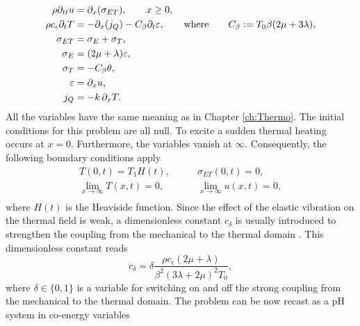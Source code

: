 \begin{equation}
\begin{aligned}
\displaystyle \rho \partial_{tt} u &= \partial_x ({\sigma}_{ET}), \qquad x\ge 0,  \\
\displaystyle \rho c_\epsilon \partial_{t} T &= -\partial_x(j_Q) - {C}_\beta \partial_t \varepsilon, \qquad \text{where} \qquad {C}_\beta:=T_0 \beta(2\mu + 3\lambda),\\
{\sigma}_{ET} &= {\sigma}_E + {\sigma}_{T}, \\
{\sigma}_E &= (2\mu + \lambda) \varepsilon , \\
{\sigma}_T &= - {C}_\beta \theta,  \\
{\varepsilon} &= \partial_x u, \\
{j}_Q &= -k \, \partial_x T.
\end{aligned}
\end{equation}
All the variables have the same meaning as in Chapter \ref{ch:Thermo}. The initial conditions for this problem are all null. To excite a sudden thermal heating occurs at $x=0$. Furthermore, the variables vanish at $\infty$. Consequently, the following boundary conditions apply
\begin{equation*}
\begin{aligned}
T(0, t) = T_1 H(t), \\
\lim_{x \rightarrow \infty} T(x, t) = 0, \\
\end{aligned} \qquad 
\begin{aligned}
\sigma_{ET}(0, t) = 0, \\
\lim_{x \rightarrow \infty} u(x, t) = 0, \\
\end{aligned}
\end{equation*}
where $H(t)$ is the Heaviside function. Since the effect of the elastic vibration on the thermal field is weak, a dimensionless constant $c_\delta$ is usually introduced to strengthen the coupling from the mechanical to the thermal domain \cite{rabizadeh2016}. This dimensionless constant reads 
\begin{equation}\label{eq:c_delta}
c_\delta = \delta \frac{\rho c_\epsilon (2 \mu + \lambda)}{\beta^2 (3 \lambda + 2 \mu)^2 T_0},
\end{equation}
where $\delta \in \{0, 1\}$ is a variable for switching on and off the strong coupling from the mechanical to the thermal domain. The problem can be now recast as a pH system in co-energy variables
